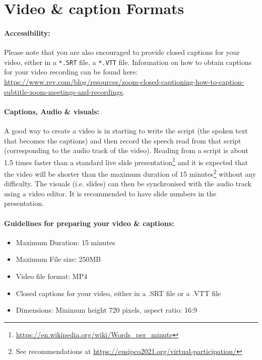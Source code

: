 \documentclass[english,a4paper,11pt,oneside,onecolumn]{article}
\begin{document}
\section{Video \& caption Formats}

\paragraph{Accessibility:} Please note that you are also  encouraged to provide closed captions for your video, either in a \texttt{*.SRT} file, a \texttt{*.VTT} file. Information on how to obtain captions for your video recording can be found here:\\
\footnotesize{\href{https://www.rev.com/blog/resources/zoom-closed-captioning-how-to-caption-subtitle-zoom-meetings-and-recordings}{https://www.rev.com/blog/resources/zoom-closed-captioning-how-to-caption-subtitle-zoom-meetings-and-recordings}}. 
\normalsize

\paragraph{Captions, Audio \& visuals:} A good way to create a video  is in starting to write the script (the spoken text that becomes the captions) and then record the speech read from that script (corresponding to the audio track of the video). Reading from a script is about 1.5 times faster than a standard live slide presentation\footnote{\url{https://en.wikipedia.org/wiki/Words_per_minute}} and it is expected that the video will be shorter than the maximum duration of 15 minutes\footnote{See recommendations at \url{https://eusipco2021.org/virtual-participation/}} without any difficulty. The visuals (i.e. slides) can then be synchronised with the audio track using a video editor. 
It is recommended to have slide numbers in the presentation. 


\paragraph{Guidelines for preparing your video \& captions:} 
\begin{itemize}
    \item Maximum Duration: 15 minutes 
    \item Maximum File size: 250MB 
    \item Video file format: MP4
    \item Closed captions for your video, either in a .SRT file or a .VTT file
    \item Dimensions: Minimum height 720 pixels, aspect ratio: 16:9
\end{itemize}
\end{document}

